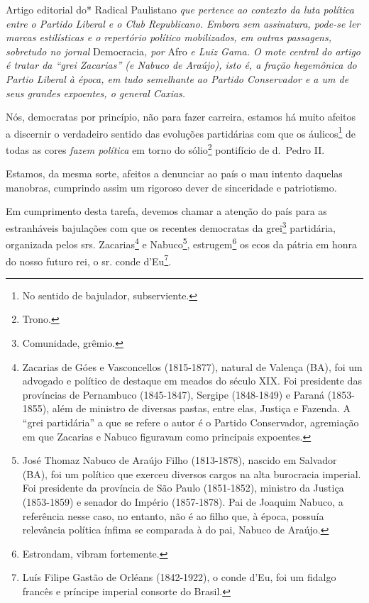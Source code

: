 \begin{didascalia}
Artigo editorial do* Radical Paulistano \emph{que pertence ao contexto
da luta política entre o Partido Liberal e o Club Republicano. Embora
sem assinatura, pode-se ler marcas estilísticas e o repertório político
mobilizados, em outras passagens, sobretudo no jornal} Democracia\emph{,
por} Afro \emph{e Luiz Gama. O mote central do artigo é tratar da ``grei
Zacarias'' (e Nabuco de Araújo), isto é, a fração hegemônica do Partio
Liberal à época, em tudo semelhante ao Partido Conservador e a um de
seus grandes expoentes, o general Caxias.}
\end{didascalia}

\asterisc{}

Nós, democratas por princípio, não para fazer carreira, estamos há muito
afeitos a discernir o verdadeiro sentido das evoluções partidárias com
que os áulicos\footnote{No sentido de bajulador, subserviente.} de
todas as cores \emph{fazem política} em torno do sólio\footnote{Trono.}
pontifício de d.~Pedro II.

Estamos, da mesma sorte, afeitos a denunciar ao país o mau intento
daquelas manobras, cumprindo assim um rigoroso dever de sinceridade e
patriotismo.

Em cumprimento desta tarefa, devemos chamar a atenção do país para as
estranháveis bajulações com que os recentes democratas da
grei\footnote{Comunidade, grêmio.} partidária, organizada pelos srs.
Zacarias\footnote{Zacarias de Góes e Vasconcellos (1815-1877), natural
  de Valença (BA), foi um advogado e político de destaque em meados do
  século XIX. Foi presidente das províncias de Pernambuco (1845-1847),
  Sergipe (1848-1849) e Paraná (1853-1855), além de ministro de diversas
  pastas, entre elas, Justiça e Fazenda. A ``grei partidária'' a que se
  refere o autor é o Partido Conservador, agremiação em que Zacarias e
  Nabuco figuravam como principais expoentes.} e Nabuco\footnote{José
  Thomaz Nabuco de Araújo Filho (1813-1878), nascido em Salvador (BA),
  foi um político que exerceu diversos cargos na alta burocracia
  imperial. Foi presidente da província de São Paulo (1851-1852),
  ministro da Justiça (1853-1859) e senador do Império (1857-1878). Pai
  de Joaquim Nabuco, a referência nesse caso, no entanto, não é ao filho
  que, à época, possuía relevância política ínfima se comparada à do
  pai, Nabuco de Araújo.}, estrugem\footnote{Estrondam, vibram
  fortemente.} os ecos da pátria em honra do nosso futuro rei, o sr.
conde d'Eu\footnote{Luís Filipe Gastão de Orléans (1842-1922), o conde
  d'Eu, foi um fidalgo francês e príncipe imperial consorte do Brasil.}.

